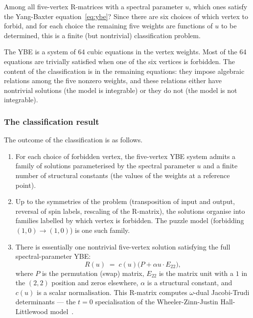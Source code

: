 Among all five-vertex R-matrices with a spectral parameter $u$, which
ones satisfy the Yang-Baxter equation~\eqref{eq:ybe}?  Since there are
six choices of which vertex to forbid, and for each choice the
remaining five weights are functions of $u$ to be determined, this is
a finite (but nontrivial) classification problem.

The YBE is a system of 64 cubic equations in the vertex weights.
Most of the 64 equations are trivially satisfied when one of the six
vertices is forbidden.  The content of the classification is in the
remaining equations: they impose algebraic relations among the five
nonzero weights, and these relations either have nontrivial solutions
(the model is integrable) or they do not (the model is not
integrable).

\subsubsection*{The classification result}

The outcome of the classification is as follows.

\begin{enumerate}
\item For each choice of forbidden vertex, the five-vertex YBE system
  admits a family of solutions parameterised by the spectral parameter
  $u$ and a finite number of structural constants (the values of the
  weights at a reference point).

\item Up to the symmetries of the problem (transposition of input and
  output, reversal of spin labels, rescaling of the R-matrix), the
  solutions organise into families labelled by which vertex is
  forbidden.  The puzzle model (forbidding $(1,0) \to (1,0)$) is one
  such family.

\item There is essentially one nontrivial five-vertex solution
  satisfying the full spectral-parameter YBE:
  \begin{equation}
  \label{eq:five-vertex-unique}
    R(u) \;=\; c(u)\bigl(P + \alpha u \cdot E_{22}\bigr),
  \end{equation}
  where $P$ is the permutation (swap) matrix, $E_{22}$ is the matrix
  unit with a $1$ in the $(2,2)$ position and zeros elsewhere,
  $\alpha$ is a structural constant, and $c(u)$ is a scalar
  normalisation.  This R-matrix computes $\omega$-dual Jacobi-Trudi
  determinants --- the $t = 0$ specialisation of the
  Wheeler-Zinn-Justin Hall-Littlewood
  model~\cite{wheeler-zinn-justin-2016}.
\end{enumerate}

